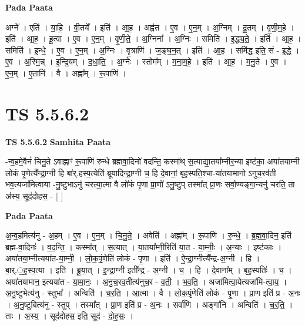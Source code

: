 \documentclass[17pt]{extarticle}
\begin{document}
\textbf{Pada Paata} \newline

अग्ने᳚ । एति॑ । या॒हि॒ । वी॒तये᳚ । इति॑ । आ॒ह॒ । अह्व॑त । ए॒व । ए॒न॒म् । अ॒ग्निम् । दू॒तम् । वृ॒णी॒म॒हे॒ । इति॑ । आ॒ह॒ । हू॒त्वा । ए॒व । ए॒न॒म् । वृ॒णी॒ते॒ । अ॒ग्निना᳚ । अ॒ग्निः । समिति॑ । इ॒द्ध्य॒ते॒ । इति॑ । आ॒ह॒ । समिति॑ । इ॒न्धे॒ । ए॒व । ए॒न॒म् । अ॒ग्निः । वृ॒त्राणि॑ । ज॒ङ्घ॒न॒त् । इति॑ । आ॒ह॒ । समि॑द्ध॒ इति॒ सं - इ॒द्धे॒ । ए॒व । अ॒स्मि॒न्न् । इ॒न्द्रि॒यम् । द॒धा॒ति॒ । अ॒ग्नेः । स्तोम᳚म् । म॒ना॒म॒हे॒ । इति॑ । आ॒ह॒ । म॒नु॒ते । ए॒व । ए॒न॒म् । ए॒तानि॑ । वै । अह्ना᳚म् । रू॒पाणि॑ ।  \newline




\section*{ TS 5.5.6.2 }

\textbf{TS 5.5.6.2 } \newline
\textbf{Samhita Paata} \newline

-न्व॒हमे॒वैनं॑ चिनु॒ते ऽवाह्नाꣳ॑ रू॒पाणि॑ रुन्धे ब्रह्मवा॒दिनो॑ वदन्ति॒ कस्मा᳚थ् स॒त्याद्या॒तया᳚म्नीर॒न्या इष्ट॑का॒ अया॑तयाम्नी लोकं पृ॒णेत्यै᳚न्द्रा॒ग्नी हि बा॑र्.हस्प॒त्येति॑ ब्रूयादिन्द्रा॒ग्नी च॒ हि दे॒वानां॒ बृह॒स्पति॒श्चा-या॑तयामानो ऽनुच॒रव॑ती भव॒त्यजा॑मित्वाया -नु॒ष्टुभाऽनु॑ चरत्या॒त्मा वै लो॑कं पृ॒णा प्रा॒णो॑ ऽनु॒ष्टुप् तस्मा᳚त् प्रा॒णः सर्वा॒ण्यङ्गा॒न्यनु॑ चरति॒ ता अ॑स्य॒ सूद॑दोहस॒ - [  ] \newline

\textbf{Pada Paata} \newline

अ॒न्व॒हमित्य॑नु - अ॒हम् । ए॒व । ए॒न॒म् । चि॒नु॒ते॒ । अवेति॑ । अह्ना᳚म् । रू॒पाणि॑ । रु॒न्धे॒ । ब्र॒ह्म॒वा॒दिन॒ इति॑ ब्रह्म-वा॒दिनः॑ । व॒द॒न्ति॒ । कस्मा᳚त् । स॒त्यात् । या॒तया᳚म्नी॒रिति॑ या॒त - या॒म्नीः॒ । अ॒न्याः । इष्ट॑काः । अया॑तया॒म्नीत्यया॑त-या॒म्नी॒ । लो॒क॒पृं॒णेति॑ लोकं - पृ॒णा । इति॑ । ऐ॒न्द्रा॒ग्नीत्यै᳚न्द्र-अ॒ग्नी । हि । बा॒र्.॒ह॒स्प॒त्या । इति॑ । ब्रू॒या॒त् । इ॒न्द्रा॒ग्नी इती᳚न्द्र - अ॒ग्नी । च॒ । हि । दे॒वाना᳚म् । बृह॒स्पतिः॑ । च॒ । अया॑तयामान॒ इत्यया॑त - या॒मा॒नः॒ । अ॒नु॒च॒रव॒तीत्य॑नुच॒र - व॒ती॒ । भ॒व॒ति॒ । अजा॑मित्वा॒येत्यजा॑मि-त्वा॒य॒ । अ॒नु॒ष्टुभेत्य॑नु - स्तुभा᳚ । अन्विति॑ । च॒र॒ति॒ । आ॒त्मा । वै । लो॒क॒पृं॒णेति॑ लोकं - पृ॒णा । प्रा॒ण इति॑ प्र - अ॒नः । अ॒नु॒ष्टुबित्य॑नु - स्तुप् । तस्मा᳚त् । प्रा॒ण इति॑ प्र - अ॒नः । सर्वा॑णि । अङ्गा॑नि । अन्विति॑ । च॒र॒ति॒ । ताः । अ॒स्य॒ । सूद॑दोहस॒ इति॒ सूद॑ - दो॒ह॒सः॒ ।  \newline
\end{document}
